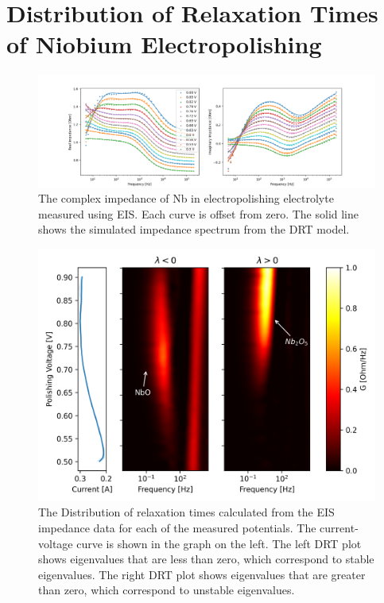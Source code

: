 \section{Distribution of Relaxation Times of Niobium Electropolishing}



\begin{figure}[t]
  
  \includegraphics[width=\textwidth]{../figures/bodeplot.png}
  \caption{The complex impedance of Nb in electropolishing electrolyte measured using EIS. Each curve is offset from zero. The solid line shows the simulated impedance spectrum from the DRT model.}
  \label{fig:bodeplot}
\end{figure}

\begin{figure}[t]
  
  \includegraphics[width=\textwidth]{../figures/gamma.png}  
  \caption{The Distribution of relaxation times calculated from the EIS impedance data for each of the measured potentials. The current-voltage curve is shown in the graph on the left. The left DRT plot shows eigenvalues that are less than zero, which correspond to stable eigenvalues. The right DRT plot shows eigenvalues that are greater than zero, which correspond to unstable eigenvalues.}
  \label{fig:gamma}
\end{figure}

